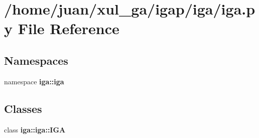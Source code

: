 \section{/home/juan/xul\_\-ga/igap/iga/iga.py File Reference}
\label{iga_8py}
\subsection*{Namespaces}
\begin{CompactItemize}
\item 
namespace {\bf iga::iga}
\end{CompactItemize}
\subsection*{Classes}
\begin{CompactItemize}
\item 
class {\bf iga::iga::IGA}
\end{CompactItemize}
